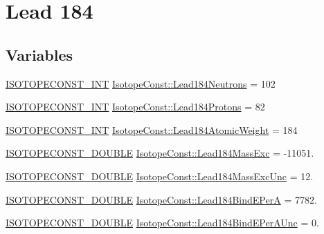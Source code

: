 \hypertarget{group___isotope_const-_lead-_pb184}{}\section{Lead 184}
\label{group___isotope_const-_lead-_pb184}
\subsection*{Variables}
\begin{DoxyCompactItemize}
\item 
\mbox{\hyperlink{group___isotope_const-_macros_ga5f18360b3e99483a35c32d789e62621c}{I\+S\+O\+T\+O\+P\+E\+C\+O\+N\+S\+T\+\_\+\+I\+NT}} \mbox{\hyperlink{group___isotope_const-_lead-_pb184_gacb8e26d6cead62496a16d493408f1e29}{Isotope\+Const\+::\+Lead184\+Neutrons}} = 102
\item 
\mbox{\hyperlink{group___isotope_const-_macros_ga5f18360b3e99483a35c32d789e62621c}{I\+S\+O\+T\+O\+P\+E\+C\+O\+N\+S\+T\+\_\+\+I\+NT}} \mbox{\hyperlink{group___isotope_const-_lead-_pb184_ga7675b4e330d98314b885e9fd8ab03f45}{Isotope\+Const\+::\+Lead184\+Protons}} = 82
\item 
\mbox{\hyperlink{group___isotope_const-_macros_ga5f18360b3e99483a35c32d789e62621c}{I\+S\+O\+T\+O\+P\+E\+C\+O\+N\+S\+T\+\_\+\+I\+NT}} \mbox{\hyperlink{group___isotope_const-_lead-_pb184_ga52554030a0b975e0b03766c5b6eabb70}{Isotope\+Const\+::\+Lead184\+Atomic\+Weight}} = 184
\item 
\mbox{\hyperlink{group___isotope_const-_macros_ga8f45a7272ce02c0b4c65c44636ed719a}{I\+S\+O\+T\+O\+P\+E\+C\+O\+N\+S\+T\+\_\+\+D\+O\+U\+B\+LE}} \mbox{\hyperlink{group___isotope_const-_lead-_pb184_ga8da2d3abdf250925903998d79a6193d8}{Isotope\+Const\+::\+Lead184\+Mass\+Exc}} = -\/11051.
\item 
\mbox{\hyperlink{group___isotope_const-_macros_ga8f45a7272ce02c0b4c65c44636ed719a}{I\+S\+O\+T\+O\+P\+E\+C\+O\+N\+S\+T\+\_\+\+D\+O\+U\+B\+LE}} \mbox{\hyperlink{group___isotope_const-_lead-_pb184_ga13939c4ab5648ccc28afefa8e5e77767}{Isotope\+Const\+::\+Lead184\+Mass\+Exc\+Unc}} = 12.
\item 
\mbox{\hyperlink{group___isotope_const-_macros_ga8f45a7272ce02c0b4c65c44636ed719a}{I\+S\+O\+T\+O\+P\+E\+C\+O\+N\+S\+T\+\_\+\+D\+O\+U\+B\+LE}} \mbox{\hyperlink{group___isotope_const-_lead-_pb184_ga66179e497deb2b573be74485cd331002}{Isotope\+Const\+::\+Lead184\+Bind\+E\+PerA}} = 7782.
\item 
\mbox{\hyperlink{group___isotope_const-_macros_ga8f45a7272ce02c0b4c65c44636ed719a}{I\+S\+O\+T\+O\+P\+E\+C\+O\+N\+S\+T\+\_\+\+D\+O\+U\+B\+LE}} \mbox{\hyperlink{group___isotope_const-_lead-_pb184_gae657bd2b496b1d406b875a25140a927b}{Isotope\+Const\+::\+Lead184\+Bind\+E\+Per\+A\+Unc}} = 0.

\end{DoxyCompactItemize}
